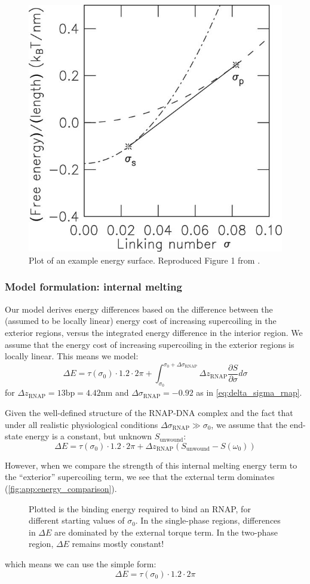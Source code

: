 \documentclass[11pt]{article}
\begin{document}
\begin{figure}[h]
    \centering
    \includegraphics[width=.5\linewidth]{figures/marko_linking_number_graph}
    \caption{Plot of an example energy surface. Reproduced Figure 1 from \textcite{markoTorqueDynamicsLinking2007}.}
    \label{fig:marko_energy_surface}
\end{figure}
\subsubsection{Model formulation: internal melting}
Our model derives energy differences based on the difference between the (assumed to be locally linear) energy cost of increasing supercoiling in the exterior regions,
versus the integrated energy difference in the interior region. We assume that the energy cost of increasing supercoiling in the exterior regions is locally linear.  This means we model:
\[\Delta E = \tau(\sigma_0) \cdot 1.2 \cdot 2\pi + \int_{\sigma_0}^{\sigma_0 + \Delta \sigma_\text{RNAP}} \Delta z_\text{RNAP} \frac{\partial S}{\partial \sigma} d\sigma\]
for \(\Delta z_\text{RNAP} = 13 \text{bp} = 4.42 \text{nm}\) and \(\Delta \sigma_\text{RNAP} = -0.92\) as in \autoref{eq:delta_sigma_rnap}.

Given the well-defined structure of the RNAP-DNA complex and the fact that under all realistic physiological conditions \(\Delta \sigma_\text{RNAP} \gg \sigma_0\), we assume that the end-state energy is a constant, but unknown \(S_\text{unwound}\):
\begin{equation}
    \Delta E = \tau(\sigma_0) \cdot 1.2 \cdot 2\pi + \Delta z_\text{RNAP} \left(S_\text{unwound} - S(\omega_0)\right)
\end{equation}


However, when we compare the strength of this internal melting energy term to the ``exterior'' supercoiling term, we see that the external term dominates (\autoref{fig:app:energy_comparison}).
\begin{figure}[h]
    \centering
    \caption{Plotted is the binding energy required to bind an RNAP, for different starting values of \(\sigma_0\). In the single-phase regions, differences in \(\Delta E\) are dominated by the external torque term. In the two-phase region, \(\Delta E\) remains mostly constant!}
    \label{fig:app:energy_comparison}
\end{figure}
which means we can use the simple form:
\begin{equation}
    \Delta E = \tau(\sigma_0) \cdot 1.2 \cdot 2\pi
\end{equation}
\end{document}
